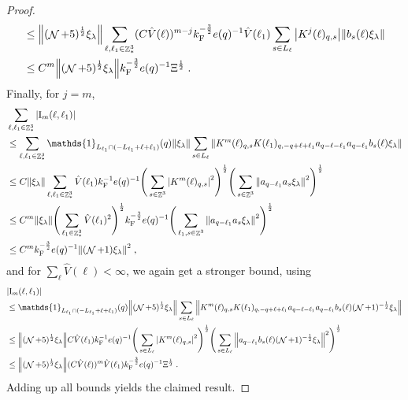 \documentclass[12pt,a4paper]{article}
\numberwithin{equation}{section}
\newcommand{\1}{\mathbb{I}}
\newcommand{\F}{\mathrm{F}}
\newcommand{\I}{\mathrm{I}}
\DeclareMathOperator{\Z}{\mathbb{Z}}
\DeclareMathOperator{\NN}{\mathcal{N}}
\newcommand{\half}{\frac{1}{2}}
\theoremstyle{plain}
\theoremstyle{definition}
\theoremstyle{remark}
\theoremstyle{plain}
\theoremstyle{definition}
\theoremstyle{remark}
\begin{document}
\begin{proof}
\begin{align}
	&\leq \norm{ (\NN+5)^{\half} \xi_\lambda}
		\sum_{\ell,\ell_1 \in \Z^3_*} (C \hat{V}(\ell))^{m-j} k_{\F}^{-\frac 32} e(q)^{-1}
		\hat{V}(\ell_1)
		\sum\limits_{s\in L_{\ell}}\abs{K^{j}(\ell)_{q,s}}
		\norm{b_{s}(\ell) \xi_\lambda }		
	\nonumber\\
	&\leq C^m \norm{(\NN+5)^\half \xi_\lambda }
		k_{\F}^{-\frac 32} e(q)^{-1} \Xi^\half \;. \label{eq:estEQ1122}
\end{align}
Finally, for $ j = m $,
\textcolor{green!30!black}{
\begin{align}
	&\sum_{\ell,\ell_1 \in \Z^3_*} |\I_m(\ell, \ell_1)| \nonumber\\
	&\leq \sum_{\ell,\ell_1 \in \Z^3_*} \mathds{1}_{L_{\ell_1} \cap (-L_{\ell_1} + \ell + \ell_1)}(q) \norm{\xi_\lambda}
		\sum\limits_{s \in L_{\ell}}
		\norm{ K^m(\ell)_{q,s} K(\ell_1)_{q,-q+\ell+\ell_1} a_{q-\ell-\ell_1} a_{q-\ell_1} b_{s}(\ell) \xi_\lambda } \nonumber\\
	&\leq C \norm{\xi_\lambda}
		\sum_{\ell,\ell_1 \in \Z^3_*} \hat{V}(\ell_1) k_{\F}^{-1} e(q)^{-1}
		\Bigg( \sum\limits_{s \in \Z^3} \abs{K^m(\ell)_{q,s}}^2\Bigg)^\half \Bigg(\sum\limits_{s \in \Z^3} \norm{ a_{q-\ell_1} a_s \xi_\lambda }^2\Bigg)^\half \nonumber\\
	&\leq C^m \norm{\xi_\lambda }
		\Bigg( \sum_{\ell_1 \in \Z^3_*} \hat{V}(\ell_1)^2 \Bigg)^{\half}
		k_{\F}^{-\frac 32} e(q)^{-1}
		\Bigg(\sum\limits_{\ell_1,s \in \Z^3} \norm{ a_{q-\ell_1} a_s \xi_\lambda }^2\Bigg)^\half \nonumber\\
	&\leq C^m k_{\F}^{-\frac 32} e(q)^{-1} \norm{(\NN+1) \xi_\lambda }^2 \;, \label{eq:estEQ1123_Coulomb}
\end{align}
and for $ \sum_{\ell} \hat{V}(\ell) < \infty $, we again get a stronger bound, using
}
\begin{align}
	&|\I_m(\ell, \ell_1)| \nonumber\\
	&\leq \mathds{1}_{L_{\ell_1} \cap (-L_{\ell_1} + \ell + \ell_1)}(q) \norm{(\NN+5)^{\half} \xi_\lambda}
		\sum\limits_{s \in L_{\ell}}
		\norm{ K^m(\ell)_{q,s} K(\ell_1)_{q,-q+\ell+\ell_1} a_{q-\ell-\ell_1} a_{q-\ell_1} b_{s}(\ell) (\NN+1)^{-\half} \xi_\lambda } \nonumber\\
	&\leq \norm{(\NN+5)^{\half} \xi_\lambda}
		C \hat{V}(\ell_1) k_{\F}^{-1} e(q)^{-1}
		\Bigg( \sum\limits_{s \in L_{\ell}} \abs{K^m(\ell)_{q,s}}^2\Bigg)^\half \Bigg(\sum\limits_{s \in L_{\ell}} \norm{ a_{q-\ell_1} b_s(\ell) (\NN+1)^{-\half} \xi_\lambda }^2\Bigg)^\half \nonumber\\
	&\leq \norm{(\NN+5)^\half \xi_\lambda }
		(C \hat{V}(\ell))^m
		\hat{V}(\ell_1)
		k_{\F}^{-\frac 32} e(q)^{-1} \Xi^\half \;. \label{eq:estEQ1123}
\end{align}
Adding up all bounds yields the claimed result.
\end{proof}
\end{document}
